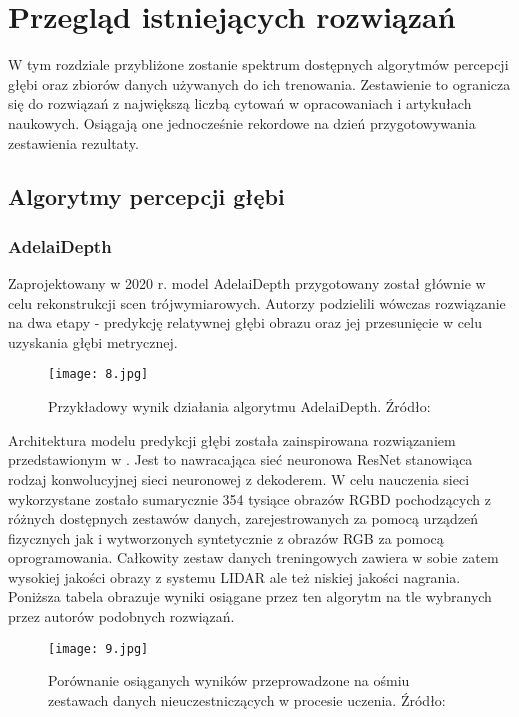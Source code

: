 \chapter{Przegląd istniejących rozwiązań}\label{chap:3_przegląd_istniejących_rozwiązań}

W tym rozdziale przybliżone zostanie spektrum dostępnych algorytmów percepcji głębi oraz zbiorów danych używanych do ich trenowania. Zestawienie to ogranicza się do rozwiązań z największą liczbą cytowań w opracowaniach i artykułach naukowych. Osiągają one jednocześnie rekordowe na dzień przygotowywania zestawienia rezultaty.

\section{Algorytmy percepcji głębi}
\subsection{AdelaiDepth}
Zaprojektowany w 2020 r. model AdelaiDepth \cite{yin2020} przygotowany został głównie w celu rekonstrukcji scen trójwymiarowych. Autorzy podzielili wówczas rozwiązanie na dwa etapy - predykcję relatywnej głębi obrazu oraz jej przesunięcie w celu uzyskania głębi metrycznej.
\begin{figure}[H]
    \centering
    \texttt{[image: 8.jpg]}
    \caption{Przykładowy wynik działania algorytmu AdelaiDepth. Źródło: \cite{yin2020}}
    \label{fig:adelaidepth}
\end{figure}
Architektura modelu predykcji głębi została zainspirowana rozwiązaniem przedstawionym w \cite{xian2020}. Jest to nawracająca sieć neuronowa ResNet \cite{he2015} stanowiąca rodzaj konwolucyjnej sieci neuronowej z dekoderem. W celu nauczenia sieci wykorzystane zostało sumarycznie 354 tysiące obrazów RGBD pochodzących z różnych dostępnych zestawów danych, zarejestrowanych za pomocą urządzeń fizycznych jak i wytworzonych syntetycznie z obrazów RGB za pomocą oprogramowania. Całkowity zestaw danych treningowych zawiera w sobie zatem  wysokiej jakości obrazy z systemu LIDAR ale też niskiej jakości nagrania. Poniższa tabela obrazuje wyniki osiągane przez ten algorytm na tle wybranych przez autorów podobnych rozwiązań.
\begin{figure}[H]
    \centering
    \texttt{[image: 9.jpg]}
    \caption{Porównanie osiąganych wyników przeprowadzone na ośmiu zestawach danych nieuczestniczących w procesie uczenia. Źródło: \cite{yin2020}}
    \label{fig:adelaidepth-results}
\end{figure}

